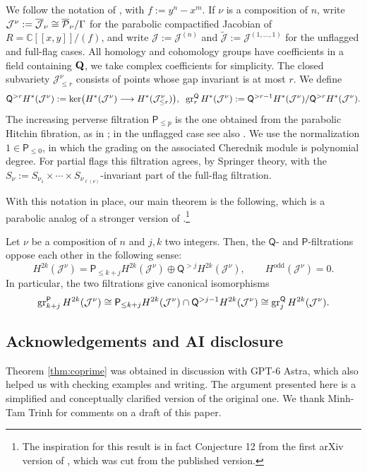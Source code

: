 \documentclass[a4paper,11pt,leqno]{amsart}
\newcommand{\C}{\mathbb C}\newcommand{\J}{\mathcal J}
\newcommand{\tJ}{\widetilde{\mathcal J}}\newcommand{\DR}{DR_n}
\begin{document}
We follow the notation of \cite[\S1 and \S8]{KTpublished}, with
$f:=y^n-x^m$. If $\nu$ is a composition of $n$, write
$\J^\nu:=\CptJac_\nu\cong\CptPic_\nu/\Gamma$ for the parabolic
compactified Jacobian of $R=\C[[x,y]]/(f)$, and write
$\J:=\J^{(n)}$ and $\tJ:=\J^{(1,\ldots,1)}$ for the unflagged and
full-flag cases. All homology and cohomology groups have coefficients in a field containing $\mathbf{Q}$, we take complex coefficients for simplicity. The closed subvariety $\J^\nu_{\le r}$ consists of points
whose gap invariant is at most $r$. We define
\[
 \mathsf{Q}^{>r}H^*(\J^\nu)
 :=\ker\bigl(H^*(\J^\nu)\longrightarrow H^*(\J^\nu_{\le r})\bigr), \;\; \gr^{\mathsf{Q}}_rH^*(\J^\nu):=\mathsf{Q}^{>r-1}H^*(\J^\nu)/\mathsf{Q}^{>r}H^*(\J^\nu).
\]
The increasing perverse filtration $\mathsf{P}_{\le p}$ is the one obtained
from the parabolic Hitchin fibration, as in
\cite[Definition 8.5.1]{OY16}; in the unflagged case see also
\cite[\S5.3]{OY17}. We use the normalization $1\in \mathsf{P}_{\le0}$, in
which the grading on the associated Cherednik module is polynomial
degree. For partial flags this filtration agrees, by Springer theory, with the $S_\nu:=S_{\nu_1}\times\cdots\times S_{\nu_{\ell(\nu)}}$-invariant part of the full-flag
filtration.

With this notation in place, our main theorem is the following, which is a parabolic analog of a stronger version of \cite[Conjecture 8.10]{KTpublished}.\footnote{The inspiration for this result is in fact Conjecture 12 from the first arXiv version of \cite{KTpublished}, which was cut from the published version.}
\begin{thm}\label{thm:coprime}
Let $\nu$ be a composition of $n$ and $j,k$ two integers. Then, the $\mathsf{Q}$- and $\mathsf{P}$-filtrations oppose each other in the following sense:
\begin{equation}
\label{eq:coprime}
 H^{2k}(\J^\nu)=\mathsf{P}_{\le k+j}H^{2k}(\J^\nu)
                  \oplus \mathsf{Q}^{>j}H^{2k}(\J^\nu),
 \qquad H^{\mathrm{odd}}(\J^\nu)=0.
\end{equation}
In particular, the two filtrations give canonical isomorphisms
\[
 \gr^{\mathsf{P}}_{k+j}H^{2k}(\J^\nu)
 \cong \mathsf{P}_{\le k+j}H^{2k}(\J^\nu)\cap \mathsf{Q}^{>j-1}H^{2k}(\J^\nu)
 \cong \gr^{\mathsf{Q}}_jH^{2k}(\J^\nu).
\]
\end{thm}



\subsection*{Acknowledgements and AI disclosure}
Theorem \ref{thm:coprime} was obtained in discussion with GPT-6 Astra, which also helped us with checking examples and writing.
The argument presented here is a simplified and conceptually clarified version of the original one.
We thank Minh-Tam Trinh for comments on a draft of this paper.
\end{document}

